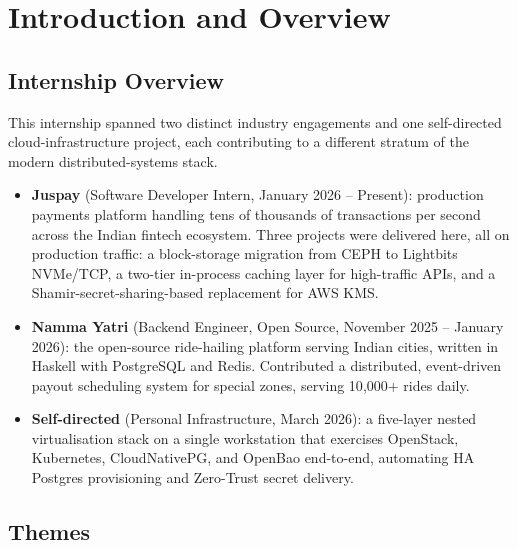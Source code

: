 \documentclass[12pt,a4paper,oneside]{report}
\begin{document}
\tableofcontents
\clearpage
\listoffigures
\clearpage
\listoftables
\clearpage

\setcounter{page}{1}

\chapter[Introduction]{Introduction and Overview}
\label{chap:intro}

\section{Internship Overview}

This internship spanned two distinct industry engagements and one self-directed cloud-infrastructure project, each contributing to a different stratum of the modern distributed-systems stack.

\begin{itemize}[leftmargin=*]
    \item \textbf{Juspay} (Software Developer Intern, January 2026 -- Present): production payments platform handling tens of thousands of transactions per second across the Indian fintech ecosystem. Three projects were delivered here, all on production traffic: a block-storage migration from CEPH to Lightbits NVMe/TCP, a two-tier in-process caching layer for high-traffic APIs, and a Shamir-secret-sharing-based replacement for AWS KMS.
    \item \textbf{Namma Yatri} (Backend Engineer, Open Source, November 2025 -- January 2026): the open-source ride-hailing platform serving Indian cities, written in Haskell with PostgreSQL and Redis. Contributed a distributed, event-driven payout scheduling system for special zones, serving 10{,}000+ rides daily.
    \item \textbf{Self-directed} (Personal Infrastructure, March 2026): a five-layer nested virtualisation stack on a single workstation that exercises OpenStack, Kubernetes, CloudNativePG, and OpenBao end-to-end, automating HA Postgres provisioning and Zero-Trust secret delivery.
\end{itemize}

\section{Themes}
\end{document}
